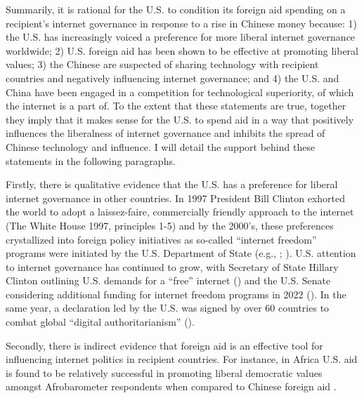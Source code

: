 Summarily, it is rational for the U.S. to condition its foreign aid spending on a recipient's internet governance in response to a rise in Chinese money because: 1) the U.S. has increasingly voiced a preference for more liberal internet governance worldwide; 2) U.S. foreign aid has been shown to be effective at promoting liberal values; 3) the Chinese are suspected of sharing technology with recipient countries and negatively influencing internet governance; and 4) the U.S. and China have been engaged in a competition for technological superiority, of which the internet is a part of. To the extent that these statements are true, together they imply that it makes sense for the U.S. to spend aid in a way that positively influences the liberalness of internet governance and inhibits the spread of Chinese technology and influence. I will detail the support behind these statements in the following paragraphs.

Firstly, there is qualitative evidence that the U.S. has a preference for liberal internet governance in other countries. In 1997 President Bill Clinton exhorted the world to adopt a laissez-faire, commercially friendly approach to the internet (The White House 1997, principles 1-5) and by the 2000's, these preferences crystallized into foreign policy initiatives as so-called ``internet freedom'' programs were initiated by the U.S. Department of State (e.g., \cite{henry2014}; \cite{u.s.departmentofstate2021}). U.S. attention to internet governance has continued to grow, with Secretary of State Hillary Clinton outlining U.S. demands for a ``free'' internet (\cite{u.s.departmentofstate2010}) and the U.S. Senate considering additional funding for internet freedom programs in 2022 (\cite{foreignrelationscommittee2022}). In the same year, a declaration led by the U.S. was signed by over 60 countries to combat global ``digital authoritarianism'' (\cite{u.s.departmentofstate2022}).

Secondly, there is indirect evidence that foreign aid is an effective tool for influencing internet politics in recipient countries. For instance, in Africa U.S. aid is found to be relatively successful in promoting liberal democratic values amongst Afrobarometer respondents when compared to Chinese foreign aid \cite{blair2022}. %

